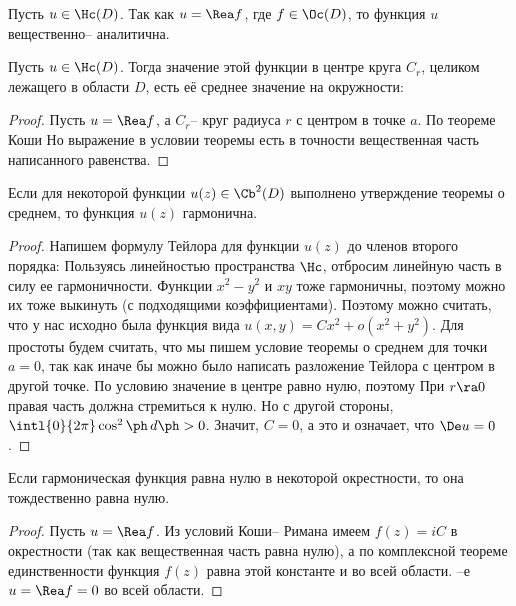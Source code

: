 \documentclass[a4paper]{article}
\begin{document}
Пусть $u\in \Hc(D)$. Так как $u = \Rea f$, где $f \in\Oc(D)$, то функция $u$ вещественно-- аналитична.

\begin{theorem}[о среднем]
Пусть $u \in \Hc(D)$. Тогда значение этой функции в центре круга $C_r$, целиком лежащего в области $D$, есть её
среднее значение на окружности:
\end{theorem}
\begin{proof}
Пусть $u = \Rea f$, а $C_r$-- круг радиуса $r$ с центром в точке $a$. По теореме Коши
Но выражение в условии теоремы есть в точности  вещественная часть написанного равенства.
\end{proof}

\begin{theorem}
Если для некоторой функции $u(z) \in \Cb^2(D)$ выполнено утверждение теоремы о среднем, то функция $u(z)$ гармонична.
\end{theorem}
\begin{proof}
Напишем формулу Тейлора для функции $u(z)$ до членов второго порядка:
Пользуясь линейностью  пространства $\Hc$, отбросим линейную часть в силу ее
гармоничности. Функции $x^2-y^2$ и $xy$ тоже гармоничны, поэтому можно их тоже выкинуть (с подходящими
коэффициентами). Поэтому можно считать, что у нас исходно была функция вида $u(x,y) = C x^2 + o(x^2+y^2)$. Для
простоты будем считать, что мы пишем условие теоремы о среднем для точки $a=0$, так как иначе бы можно
было написать разложение Тейлора с центром в другой точке. По условию значение в центре равно нулю, поэтому
При $r \ra 0$ правая часть должна стремиться к нулю.  Но с
другой стороны, $\intl{0}{2\pi}\cos^2\ph\,d\ph > 0$. Значит, $C = 0$, а это и означает, что $\De u = 0$.
\end{proof}

\begin{theorem}[единственности]
Если гармоническая функция равна нулю в некоторой окрестности, то она тождественно равна нулю.
\end{theorem}
\begin{proof}
Пусть $u =\Rea f$. Из условий Коши-- Римана имеем $f(z) = iC$ в окрестности (так как
вещественная часть равна нулю), а по комплексной теореме единственности функция $f(z)$ равна
этой константе и во всей области. --е $u = \Rea f=0$ во всей области.
\end{proof}
\end{document}
